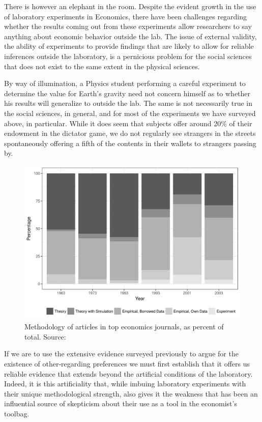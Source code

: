 \documentclass[12pt]{article}
\begin{document}
There is however an elephant in the room. Despite the evident growth in the use of laboratory experiments in Economics, there have been challenges regarding whether the results coming out from these experiments allow researchers to say anything about economic behavior outside the lab. The issue of external validity, the ability of experiments to provide findings that are likely to allow for reliable inferences outside the laboratory, is a pernicious problem for the social sciences that does not exist to the same extent in the physical sciences.

By way of illumination, a Physics student performing a careful experiment to determine the value for Earth's gravity need not concern himself as to whether his results will generalize to outside the lab. The same is not necessarily true in the social sciences, in general, and for most of the experiments we have surveyed above, in particular. While it does seem that subjects offer around 20\% of their endowment in the dictator game, we do not regularly see strangers in the streets spontaneously offering a fifth of the contents in their wallets to strangers passing by. 


\begin{figure}[H]
	\centering
	\includegraphics[width=1.\textwidth]{proportion.png}
	
	\caption{Methodology of articles in top economics journals, as percent of total. Source: \citep{mearsheimer2013leaving}}
	\label{fig:proportion}
\end{figure}


If we are to use the extensive evidence surveyed previously to argue for the existence of other-regarding preferences we must first establish that it offers us reliable evidence that extends beyond the artificial conditions of the laboratory. Indeed, it is this artificiality that, while imbuing laboratory experiments with their unique methodological strength, also gives it the weakness that has been an influential source of skepticism about their use as a tool in the economist's toolbag.
\end{document}
